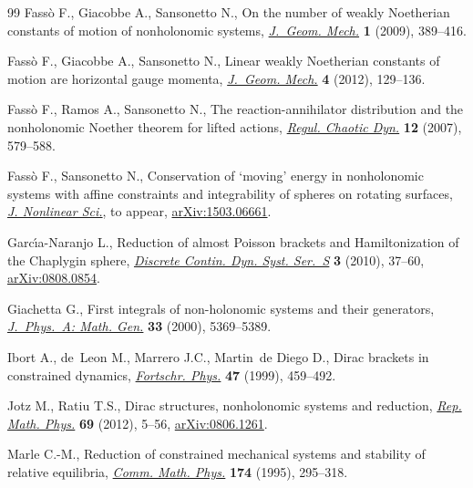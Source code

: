 \documentclass[10pt,a4paper]{amsart}
\numberwithin{equation}{section}
\begin{document}
\begin{thebibliography}{99}
Fass{\`o} F., Giacobbe A., Sansonetto N., On the number of weakly {N}oetherian
  constants of motion of nonholonomic systems, \href{http://dx.doi.org/10.3934/jgm.2009.1.389}{\textit{J.~Geom. Mech.}}
  \textbf{1} (2009), 389--416.

Fass{\`o} F., Giacobbe A., Sansonetto N., Linear weakly {N}oetherian constants
  of motion are horizontal gauge momenta, \href{http://dx.doi.org/10.3934/jgm.2012.4.129}{\textit{J.~Geom. Mech.}} \textbf{4}
  (2012), 129--136.

Fass{\`o} F., Ramos A., Sansonetto N., The reaction-annihilator distribution
  and the nonholonomic {N}oether theorem for lifted actions, \href{http://dx.doi.org/10.1134/S1560354707060019}{\textit{Regul.
  Chaotic Dyn.}} \textbf{12} (2007), 579--588.

Fass{\`o} F., Sansonetto N., Conservation of `moving' energy in nonholonomic
  systems with af\/f\/ine constraints and integrability of spheres on rotating
  surfaces, \href{http://dx.doi.org/10.1007/s00332-015-9283-4}{\textit{J. Nonlinear Sci.}}, {t}o appear, \href{http://arxiv.org/abs/1503.06661}{arXiv:1503.06661}.

Garc{\'{\i}}a-Naranjo L., Reduction of almost {P}oisson brackets and
  {H}amiltonization of the {C}haplygin sphere, \href{http://dx.doi.org/10.3934/dcdss.2010.3.37}{\textit{Discrete Contin. Dyn.
  Syst. Ser.~S}} \textbf{3} (2010), 37--60, \href{http://arxiv.org/abs/0808.0854}{arXiv:0808.0854}.

Giachetta G., First integrals of non-holonomic systems and their generators,
  \href{http://dx.doi.org/10.1088/0305-4470/33/30/308}{\textit{J.~Phys.~A: Math. Gen.}} \textbf{33} (2000), 5369--5389.

Ibort A., de~Leon M., Marrero J.C., Martin~de Diego D., Dirac brackets in
  constrained dynamics, \href{http://dx.doi.org/10.1002/(SICI)1521-3978(199906)47:5<459::AID-PROP459>3.0.CO;2-E}{\textit{Fortschr. Phys.}} \textbf{47} (1999), 459--492.

Jotz M., Ratiu T.S., Dirac structures, nonholonomic systems and reduction,
  \href{http://dx.doi.org/10.1016/S0034-4877(12)60016-0}{\textit{Rep. Math. Phys.}} \textbf{69} (2012), 5--56, \href{http://arxiv.org/abs/0806.1261}{arXiv:0806.1261}.

Marle C.-M., Reduction of constrained mechanical systems and stability of
  relative equilibria, \href{http://dx.doi.org/10.1007/BF02099604}{\textit{Comm. Math. Phys.}} \textbf{174} (1995),
  295--318.


\end{thebibliography}
\end{document}
